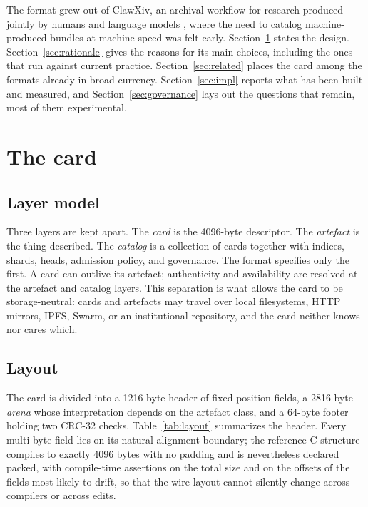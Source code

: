 \documentclass[sigconf]{acmart}
\begin{document}
The format grew out of ClawXiv, an archival workflow for research produced
jointly by humans and language models \cite{Kornai:2026a}, where the need to
catalog machine-produced bundles at machine speed was felt
early. Section~\ref{sec:card} states the design.  Section~\ref{sec:rationale}
gives the reasons for its main choices, including the ones that run against
current practice. Section~\ref{sec:related} places the card among the formats
already in broad currency.  Section~\ref{sec:impl} reports what has been
built and measured, and Section~\ref{sec:governance} lays out the questions
that remain, most of them experimental.

\section{The card}
\label{sec:card}

\subsection{Layer model}

Three layers are kept apart. The \emph{card} is the 4096-byte descriptor. The
\emph{artefact} is the thing described. The \emph{catalog} is a collection of
cards together with indices, shards, heads, admission policy, and governance.
The format specifies only the first. A card can outlive its artefact;
authenticity and availability are resolved at the artefact and catalog layers.
This separation is what allows the card to be storage-neutral: cards and
artefacts may travel over local filesystems, HTTP mirrors, IPFS, Swarm, or an
institutional repository, and the card neither knows nor cares which.

\subsection{Layout}

The card is divided into a 1216-byte header of fixed-position fields, a
2816-byte \emph{arena} whose interpretation depends on the artefact class, and a
64-byte footer holding two CRC-32 checks. Table~\ref{tab:layout} summarizes the
header. Every multi-byte field lies on its natural alignment boundary; the
reference C structure compiles to exactly 4096 bytes with no padding and is
nevertheless declared packed, with compile-time assertions on the total size
and on the offsets of the fields most likely to drift, so that the wire layout
cannot silently change across compilers or across edits.
\end{document}
